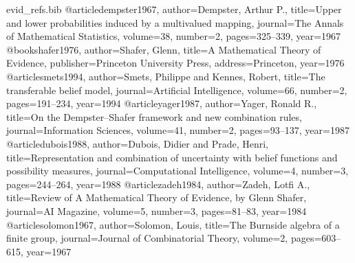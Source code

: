 \begin{filecontents}[overwrite]{evid_refs.bib}
@article{dempster1967, author={Dempster, Arthur P.}, title={Upper and lower probabilities induced by a multivalued mapping}, journal={The Annals of Mathematical Statistics}, volume={38}, number={2}, pages={325--339}, year={1967}}
@book{shafer1976, author={Shafer, Glenn}, title={A Mathematical Theory of Evidence}, publisher={Princeton University Press}, address={Princeton}, year={1976}}
@article{smets1994, author={Smets, Philippe and Kennes, Robert}, title={The transferable belief model}, journal={Artificial Intelligence}, volume={66}, number={2}, pages={191--234}, year={1994}}
@article{yager1987, author={Yager, Ronald R.}, title={On the {Dempster--Shafer} framework and new combination rules}, journal={Information Sciences}, volume={41}, number={2}, pages={93--137}, year={1987}}
@article{dubois1988, author={Dubois, Didier and Prade, Henri}, title={Representation and combination of uncertainty with belief functions and possibility measures}, journal={Computational Intelligence}, volume={4}, number={3}, pages={244--264}, year={1988}}
@article{zadeh1984, author={Zadeh, Lotfi A.}, title={Review of {A Mathematical Theory of Evidence}, by {Glenn Shafer}}, journal={AI Magazine}, volume={5}, number={3}, pages={81--83}, year={1984}}
@article{solomon1967, author={Solomon, Louis}, title={The {Burnside} algebra of a finite group}, journal={Journal of Combinatorial Theory}, volume={2}, pages={603--615}, year={1967}}

\end{filecontents}
